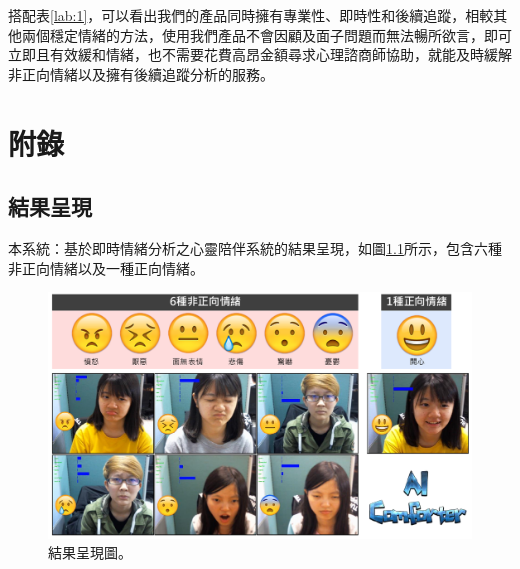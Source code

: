 \documentclass[12pt]{scrreprt}
\begin{document}
搭配表\ref{lab:1}，可以看出我們的產品同時擁有專業性、即時性和後續追蹤，相較其他兩個穩定情緒的方法，使用我們產品不會因顧及面子問題而無法暢所欲言，即可立即且有效緩和情緒，也不需要花費高昂金額尋求心理諮商師協助，就能及時緩解非正向情緒以及擁有後續追蹤分析的服務。\\

\renewcommand{\arraystretch}{1.3} %
\begin{table}[!h]    
\centering
     \caption{各類穩定情緒方法之比較}
\label{lab:1}
\end{table}

\chapter{附錄}

\section{結果呈現}

本系統：基於即時情緒分析之心靈陪伴系統的結果呈現，如圖\ref{fig:Emotion}所示，包含六種非正向情緒以及一種正向情緒。

\vspace{1cm}
\begin{figure}[!h]
\begin{center}
\includegraphics[width=1\textwidth]{./figs/Emotion.pdf}
\end{center}
\caption{結果呈現圖。}
\label{fig:Emotion}
\end{figure}
\end{document}
